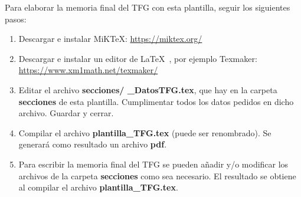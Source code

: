 \vspace*{1.5cm}
Para elaborar la memoria final del TFG con esta plantilla, seguir los siguientes pasos:
\begin{enumerate}
    \item Descargar e instalar MiKTeX:  \url{https://miktex.org/}
    \item Descargar e instalar un editor de \LaTeX~, por ejemplo Texmaker:\\
          \url{https://www.xm1math.net/texmaker/}

    \item Editar el archivo \textbf{secciones/ \_DatosTFG.tex}, que hay en la carpeta \textbf{secciones} de esta plantilla. Cumplimentar todos los datos pedidos en dicho archivo. Guardar y cerrar.
    \item Compilar el archivo \textbf{plantilla\_TFG.tex} (puede ser renombrado). Se generará como resultado un archivo \textbf{pdf}.
    \item Para escribir la memoria final del TFG se pueden añadir y/o modificar los archivos de la carpeta \textbf{secciones} como sea necesario. El resultado se obtiene al compilar el archivo \textbf{plantilla\_TFG.tex}.
\end{enumerate}

